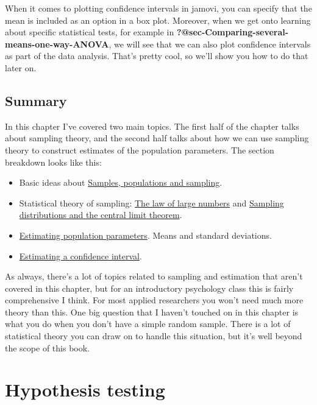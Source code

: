 \documentclass[
  a4paper,
]{book}
\providecommand{\tightlist}{%
  \setlength{\itemsep}{0pt}\setlength{\parskip}{0pt}}\usepackage{longtable,booktabs,array}
\begin{document}
When it comes to plotting confidence intervals in jamovi, you can
specify that the mean is included as an option in a box plot. Moreover,
when we get onto learning about specific statistical tests, for example
in \textbf{?@sec-Comparing-several-means-one-way-ANOVA}, we will see
that we can also plot confidence intervals as part of the data analysis.
That's pretty cool, so we'll show you how to do that later on.

\hypertarget{summary-6}{%
\section{Summary}\label{summary-6}}

In this chapter I've covered two main topics. The first half of the
chapter talks about sampling theory, and the second half talks about how
we can use sampling theory to construct estimates of the population
parameters. The section breakdown looks like this:

\begin{itemize}
\tightlist
\item
  Basic ideas about
  \protect\hyperlink{samples-populations-and-sampling}{Samples,
  populations and sampling}.
\item
  Statistical theory of sampling:
  \protect\hyperlink{the-law-of-large-numbers}{The law of large numbers}
  and
  \protect\hyperlink{sampling-distributions-and-the-central-limit-theorem}{Sampling
  distributions and the central limit theorem}.
\item
  \protect\hyperlink{estimating-population-parameters}{Estimating
  population parameters}. Means and standard deviations.
\item
  \protect\hyperlink{sec-Estimating-a-confidence-interval}{Estimating a
  confidence interval}.
\end{itemize}

As always, there's a lot of topics related to sampling and estimation
that aren't covered in this chapter, but for an introductory psychology
class this is fairly comprehensive I think. For most applied researchers
you won't need much more theory than this. One big question that I
haven't touched on in this chapter is what you do when you don't have a
simple random sample. There is a lot of statistical theory you can draw
on to handle this situation, but it's well beyond the scope of this
book.

\hypertarget{sec-Hypothesis-testing}{%
\chapter{Hypothesis testing}\label{sec-Hypothesis-testing}}
\end{document}
